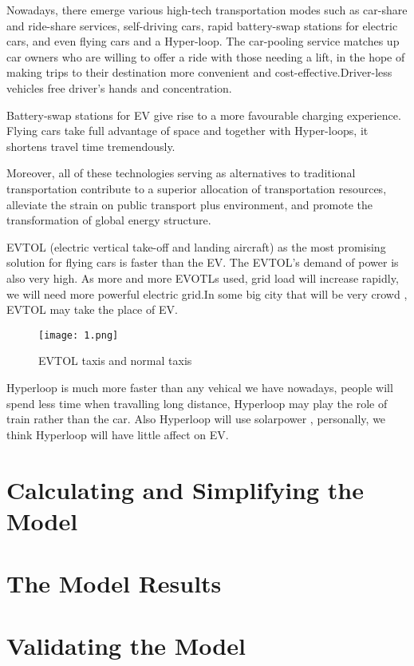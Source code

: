 \documentclass{mcmthesis}
\begin{document}
Nowadays, there emerge various high-tech transportation modes such as car-share and ride-share services, self-driving cars, rapid battery-swap stations for electric cars, and even flying cars and a Hyper-loop. The car-pooling service matches up car owners who are willing to offer a ride with those needing a lift, in the hope of making trips to their destination more convenient and cost-effective.Driver-less vehicles free driver’s hands and concentration.

Battery-swap stations for EV give rise to a more favourable charging experience. Flying cars take full advantage of space and together with Hyper-loops, it shortens travel time tremendously. 

Moreover, all of these technologies serving as alternatives to traditional transportation contribute to a superior allocation of transportation resources, alleviate the strain on public transport plus environment, and promote the transformation of global energy structure.

EVTOL (electric vertical take-off and landing aircraft) as the most promising solution for flying cars is faster than the EV. The EVTOL's demand of power is also very high. As more and more EVOTLs used, grid load will increase rapidly, we will need more powerful electric grid.In some big city that will be very crowd , EVTOL may take the place of EV.

\begin{figure}[htbp]
\small
\centering
\texttt{[image: 1.png]}
\caption{EVTOL taxis and normal taxis} 
\end{figure}

Hyperloop is much more faster than any vehical we have nowadays, people will spend less time when travalling long distance, Hyperloop may play the role of train rather than the car. Also Hyperloop will use solarpower , personally, we think Hyperloop will have little affect on EV.


\section{Calculating and Simplifying the Model  }

\section{The Model Results}


\section{Validating the Model}
\end{document}
